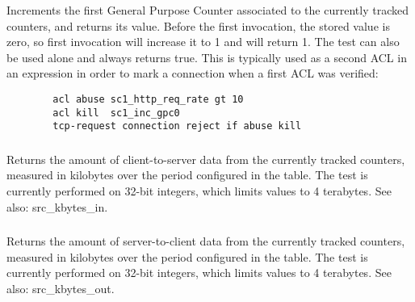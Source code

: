 \subsubsection[sc1\_inc\_gpc0]{}
\subsubsection[sc2\_inc\_gpc0]{}
  Increments the first General Purpose Counter associated to the currently
  tracked counters, and returns its value. Before the first invocation, the
  stored value is zero, so first invocation will increase it to 1 and will
  return 1. The test can also be used alone and always returns true. This is
  typically used as a second ACL in an expression in order to mark a connection
  when a first ACL was verified:
  \begin{verbatim}
        acl abuse sc1_http_req_rate gt 10
        acl kill  sc1_inc_gpc0
        tcp-request connection reject if abuse kill
  \end{verbatim}

\subsubsection[sc1\_kbytes\_in]{}
\subsubsection[sc2\_kbytes\_in]{}
  Returns the amount of client-to-server data from the currently tracked
  counters, measured in kilobytes over the period configured in the table. The
  test is currently performed on 32-bit integers, which limits values to 4
  terabytes. See also: src\_kbytes\_in.

\subsubsection[sc1\_kbytes\_out]{}
\subsubsection[sc2\_kbytes\_out]{}
  Returns the amount of server-to-client data from the currently tracked
  counters, measured in kilobytes over the period configured in the table. The
  test is currently performed on 32-bit integers, which limits values to 4
  terabytes. See also: src\_kbytes\_out.

